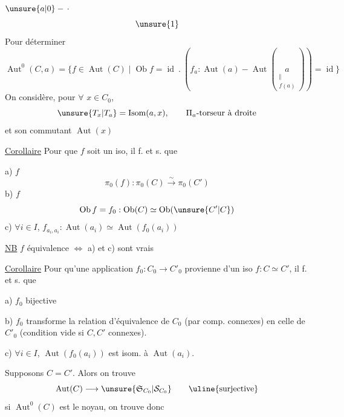 $\unsure{a|0}-\,\cdot$
\[\unsure{1}\]
 Pour déterminer
\[
\operatorname{Aut}^0(C,a)=\{f\in\operatorname{Aut}(C)\mid
\operatorname{Ob}f=\operatorname{id}\ .\
(f_a:\operatorname{Aut}(a)-\operatorname{Aut}(\underset{\substack{\Vert\\ f(a)}}{a}))=\operatorname{id}\}
\]
On considère, pour $\forall$ $x\in C_0$,
\[
\unsure{T_x|T_a}=\operatorname{Isom}(a,x),\qquad\Pi_a\text{-torseur à droite}
\]
et son commutant  $\operatorname{Aut}(x)$

\uline{Corollaire} Pour que $f$ soit un iso, il f. et s. que

a) $f$ 
\[\pi_0(f):\pi_0(C)\overset{\sim}{\longrightarrow}\pi_0(C')\]
b) $f$ 
\[\operatorname{Ob}f=f_0:\operatorname{Ob}(C)\simeq\operatorname{Ob}(\unsure{C'|C})\]
c) $\forall i\in I$, $f_{a_i,a_i}:\operatorname{Aut}(a_i)\simeq\operatorname{Aut}(f_0(a_i))$

\uline{NB} $f$ équivalence $\Longleftrightarrow$ a) et c) sont vrais

\uline{Corollaire} Pour qu'une application
$f_0:C_0\longrightarrow C'_0$ provienne d'un
iso $f:C\simeq C'$, il f. et s. que

a) $f_0$  bijective

b) $f_0$ transforme la relation d'équivalence de $C_0$ (par comp. connexes)
en celle de $C'_0$ (condition vide si $C,C'$ connexes).

c) $\forall i\in I$, $\operatorname{Aut}(f_0(a_i))$ est isom. à $\operatorname{Aut}(a_i)$.

 Supposons $C=C'$. Alors on trouve
\[\operatorname{Aut}(C)\longrightarrow\unsure{\mathfrak{S}_{C_0}|\mathcal{S}_{C_0}}\qquad\uline{\text{surjective}}\]
si $\operatorname{Aut}^0(C)$ est le noyau, on trouve donc

